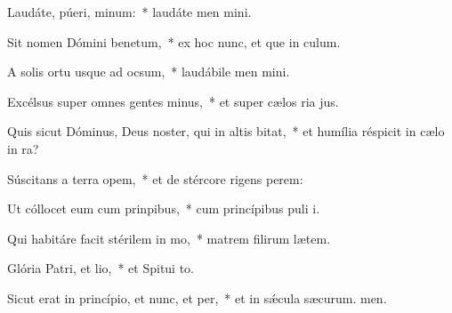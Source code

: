 \item Laudáte, púeri, minum:~* laudáte men mini.
\item Sit nomen Dómini benetum,~* ex hoc nunc, et que in culum.
\item A solis ortu usque ad ocsum,~* laudábile men mini.
\item Excélsus super omnes gentes minus,~* et super cælos ria jus.
\item Quis sicut Dóminus, Deus noster, qui in altis bitat,~* et humília réspicit in cælo  in ra?
\item Súscitans a terra opem,~* et de stércore rigens perem:
\item Ut cóllocet eum cum prinpibus,~* cum princípibus puli i.
\item Qui habitáre facit stérilem in mo,~* matrem filirum lætem.
\item Glória Patri, et lio,~* et Spitui to.
\item Sicut erat in princípio, et nunc, et per,~* et in sǽcula sæcurum. men.
